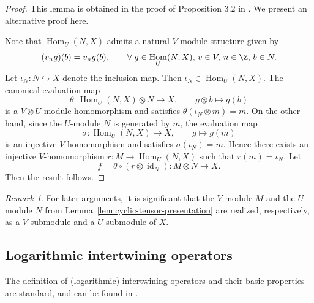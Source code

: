 \documentclass[12pt, english]{article}
\numberwithin{equation}{section}
\DeclareMathOperator{\Hom}{Hom}
\DeclareMathOperator{\id}{id}
\theoremstyle{plain}
\theoremstyle{definition}
\theoremstyle{remark}
\newtheorem{remark}[lemma]{Remark}
\begin{document}
	\begin{proof}
		
		This lemma is obtained in the proof of Proposition 3.2 in \cite{McR23}. We present an alternative proof here.
		
		Note that $\Hom_U(N, X)$ admits a natural $V$-module structure given by
		\[
		(v_n g) (b) = v_n g(b), \qquad \forall \; g \in \Hom_U(N, X), \, v \in V, \, n \in \Z, \, b \in N.
		\]
		Let $\iota_N\colon N \hookrightarrow X$ denote the inclusion map. Then $\iota_N \in \Hom_U(N, X)$.
		The canonical evaluation map
		\[
		\theta \colon \Hom_U(N, X) \otimes N \longrightarrow X, \qquad g \otimes b \longmapsto g(b)
		\]
		is a $V\otimes U$-module homomorphism and satisfies $\theta(\iota_N \otimes m) = m$.
		On the other hand, since the $U$-module $N$ is generated by $m$, the evaluation map
		\[
		\sigma \colon \Hom_U(N, X) \longrightarrow X, \qquad g \longmapsto g(m)
		\]
		is an injective $V$-homomorphism and satisfies $\sigma(\iota_N) = m$.
		Hence there exists an injective $V$-homomorphism $r \colon M \to \Hom_U(N, X)$ such that $r(m) = \iota_N$.
		Let
		\[
		f = \theta \circ (r\otimes\id_N) \colon M \otimes N \longrightarrow X.
		\]
		Then the result follows.
	\end{proof}
	
	\begin{remark}
		
		For later arguments, it is significant that the $V$-module $M$ and the $U$-module $N$ from Lemma~\ref{lem:cyclic-tensor-presentation} are realized, respectively, as a $V$-submodule and a $U$-submodule of $X$.
		
	\end{remark}
	
	\subsection{Logarithmic intertwining operators}
	
	The definition of (logarithmic) intertwining operators and their basic properties are standard,
	and can be found in \cite{HLZ10II, M02, YZ26}.
	
\end{document}
